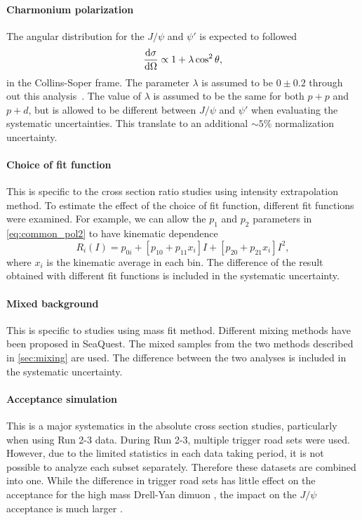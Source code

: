 \documentclass[../main.tex]{subfiles}
\begin{document}
\paragraph{Charmonium polarization}
The angular distribution for the $J/\psi$ and $\psi'$ is expected to followed
\begin{equation}
	\dv{\sigma}{\Omega} \propto 1+\lambda \cos^2\theta,
\end{equation}
in the Collins-Soper frame. The parameter $\lambda$ is assumed to be $0\pm0.2$ through out
this analysis~\cite{chang2003}. The value of $\lambda$ is assumed to be  the same for both
$p+p$ and $p+d$, but is allowed to be different between $J/\psi$ and $\psi'$ when evaluating
the systematic uncertainties. This translate to an additional $\sim 5\%$ normalization uncertainty.

\paragraph{Choice of fit function}
This is specific to the cross section ratio studies using intensity extrapolation method.
To estimate the effect of the choice of fit function, different fit functions were examined.
For example, we can allow the $p_1$ and $p_2$ parameters in \cref{eq:common_pol2} to have kinematic
dependence
\begin{equation}
	R_i \left(I\right) = p_{0i} + \left[p_{10}+p_{11}x_i\right] I + \left[p_{20}+p_{21}x_i\right] I^2,
\end{equation}
where $x_i$ is the kinematic average in each bin. The difference of the result obtained with different fit
functions is included in the systematic uncertainty.

\paragraph{Mixed background}
This is specific to studies using mass fit method. Different mixing methods have been proposed in SeaQuest.
The mixed samples from the two methods described in \cref{sec:mixing} are used. The difference between
the two analyses is included in the systematic uncertainty.

\paragraph{Acceptance simulation}
This is a major systematics in the absolute cross section studies, particularly when using
Run 2-3 data.
During Run 2-3, multiple trigger road sets were used. However, due to the limited statistics in each
data taking period, it is not possible to analyze each subset separately. Therefore these datasets
are combined into one. While the difference in trigger road sets has little effect on the acceptance
for the high mass Drell-Yan dimuon \cite{jdove-8168}, the impact on the $J/\psi$ acceptance is much
larger \cite{chleung-9643}.
\end{document}
